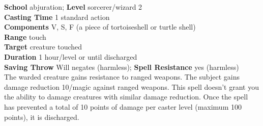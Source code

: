 \textbf{School} abjuration; \textbf{Level} sorcerer/wizard 2\\
\textbf{Casting Time} 1 standard action\\
\textbf{Components} V, S, F (a piece of tortoiseshell or turtle shell)\\
\textbf{Range} touch\\
\textbf{Target} creature touched\\
\textbf{Duration} 1 hour/level or until discharged\\
\textbf{Saving Throw }Will negates (harmless); \textbf{Spell Resistance} yes (harmless)\\
The warded creature gains resistance to ranged weapons. The subject gains damage reduction 10/magic against ranged weapons. This spell doesn't grant you the ability to damage creatures with similar damage reduction. Once the spell has prevented a total of 10 points of damage per caster level (maximum 100 points), it is discharged.\\
